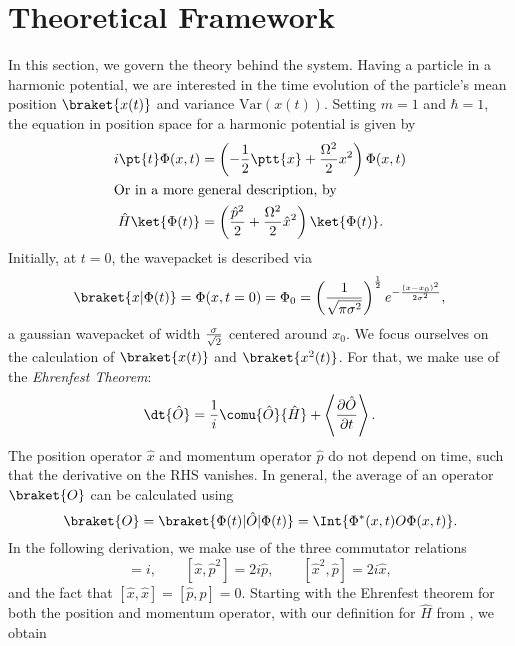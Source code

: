 \clearpage
\section{Theoretical Framework}
\label{sec: theo}
In this section, we govern the theory behind the system. Having a particle in a harmonic potential, we are interested in the time evolution of the particle's mean position $\braket{x(t)}$ and variance $\text{Var}(x(t))$.
Setting $m = 1$ and $\hbar = 1$, the \SG equation in position space for a harmonic potential is given by
\begin{align}
	i\pt{t} \Phi(x,t) &= \left(-{1\over 2} \ptt{x} + {\Omega ^2 \over 2} x^2\right)  \Phi(x,t) \label{eq: SG}\\
	\intertext{Or in a more general description, by}
	\hat{H}\ket{\Phi(t)} &= \left({\hat{p}^2\over 2} + {\Omega ^2 \over 2} \hat{x}^2 \right) \ket{\Phi(t)}.
	\label{eq: SG gen}
\end{align}
Initially, at $t=0$, the wavepacket is described via
\begin{equation}
	\braket{x |\Phi(t)} = \Phi (x, t = 0) = \Phi _0= \left({1\over {\sqrt{\pi \sigma^2}}}\right)^{1\over 2}e^{-{(x-x_0)^2 \over 2\sigma^2}},
	\label{eq: initial}
\end{equation}
a gaussian wavepacket of width ${\sigma\over\sqrt{2}}$ centered around $x_0$.
We focus ourselves on the calculation of $\braket{x(t)}$ and $\braket{x^2(t)}$. For that, we make use of the \textit{Ehrenfest Theorem}:
\begin{equation}
	\dt{\hat{O}} = {1 \over i} \comu{\hat{O}}{\hat{H}} +\left\langle{ \partial \hat{O} \over \partial t}\right\rangle.
	\label{eq: ET}
\end{equation}
The position operator $\hat{x}$ and momentum operator $\hat{p}$ do not depend on time, such that the derivative on the RHS vanishes.
In general, the average of an operator $\braket{O}$ can be calculated using
\begin{equation}
	\braket{O} = \braket{\Phi(t)|\hat{O}|\Phi(t)} =\Int{\Phi ^*(x,t) O \Phi(x,t)}.
	\label{eq: scalar}
\end{equation}
In the following derivation, we make use of the three commutator relations
\begin{equation}
	[\hat{x},\hat{p}] = i, \qquad 	[\hat{x},\hat{p}^2] = 2i\hat{p}, \qquad 	[\hat{x}^2,\hat{p}] = 2i\hat{x}, 
\end{equation}
and the fact that $[\hat{x},\hat{x}] = [\hat{p},\hat{p}] = 0$.
Starting with the Ehrenfest theorem for both the position and momentum operator, with our definition for $\hat{H}$ from , we obtain
